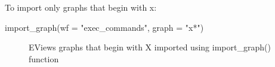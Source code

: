 \documentclass[
  letterpaper,
  DIV=11,
  numbers=noendperiod]{scrartcl}
\newenvironment{Shaded}{\begin{snugshade}}{\end{snugshade}}
\newcommand{\AttributeTok}[1]{\textcolor[rgb]{0.40,0.45,0.13}{#1}}
\newcommand{\FunctionTok}[1]{\textcolor[rgb]{0.28,0.35,0.67}{#1}}
\newcommand{\NormalTok}[1]{\textcolor[rgb]{0.00,0.23,0.31}{#1}}
\newcommand{\StringTok}[1]{\textcolor[rgb]{0.13,0.47,0.30}{#1}}
\begin{document}
To import only graphs that begin with x:

\begin{Shaded}
\begin{Highlighting}[]
\FunctionTok{import\_graph}\NormalTok{(}\AttributeTok{wf =} \StringTok{"exec\_commands"}\NormalTok{, }\AttributeTok{graph =} \StringTok{"x*"}\NormalTok{)}
\end{Highlighting}
\end{Shaded}

\begin{figure}

\begin{minipage}[t]{0.50\linewidth}

{\centering 


\caption{\label{fig-importGraph1-1}EViews graphs that begin with X
imported using import\_graph() function}

}

\end{minipage}%
%
\begin{minipage}[t]{0.50\linewidth}

{\centering 

\raisebox{-\height}{

}}
\end{minipage}
\end{figure}
\end{document}
